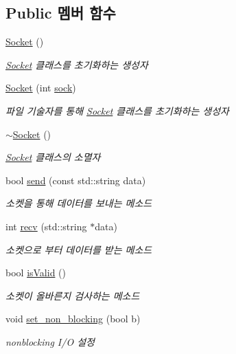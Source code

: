 \subsection*{Public 멤버 함수}
\begin{DoxyCompactItemize}
\item 
\hyperlink{classsock_1_1_socket_a9983ebd97b8f79d3e4c67fca05811dcb}{Socket} ()
\begin{DoxyCompactList}\small\item\em \hyperlink{classsock_1_1_socket}{Socket} 클래스를 초기화하는 생성자 \end{DoxyCompactList}\item 
\hyperlink{classsock_1_1_socket_a570a3285956f8923f490f9203a6d1d8f}{Socket} (int \hyperlink{classsock_1_1_socket_a01040adb35eea5ad276090b9db112f4a}{sock})
\begin{DoxyCompactList}\small\item\em 파일 기술자를 통해 \hyperlink{classsock_1_1_socket}{Socket} 클래스를 초기화하는 생성자 \end{DoxyCompactList}\item 
\mbox{\label{classsock_1_1_socket_a2efd63baf692cd9e466da55139f74838}} 
\hyperlink{classsock_1_1_socket_a2efd63baf692cd9e466da55139f74838}{$\sim$\+Socket} ()
\begin{DoxyCompactList}\small\item\em \hyperlink{classsock_1_1_socket}{Socket} 클래스의 소멸자 \end{DoxyCompactList}\item 
bool \hyperlink{classsock_1_1_socket_a1d980395d1e06e4b9e1c5c65a2220a0a}{send} (const std\+::string data)
\begin{DoxyCompactList}\small\item\em 소켓을 통해 데이터를 보내는 메소드 \end{DoxyCompactList}\item 
int \hyperlink{classsock_1_1_socket_aa52c41c177bd1f7fe785d32d46f60b9f}{recv} (std\+::string $\ast$data)
\begin{DoxyCompactList}\small\item\em 소켓으로 부터 데이터를 받는 메소드 \end{DoxyCompactList}\item 
bool \hyperlink{classsock_1_1_socket_a448363328243c35f7899761381cac1df}{is\+Valid} ()
\begin{DoxyCompactList}\small\item\em 소켓이 올바른지 검사하는 메소드 \end{DoxyCompactList}\item 
void \hyperlink{classsock_1_1_socket_a908007148692a4a8dfa6a339b679b8a8}{set\+\_\+non\+\_\+blocking} (bool b)
\begin{DoxyCompactList}\small\item\em nonblocking I/O 설정 \end{DoxyCompactList}\end{DoxyCompactItemize}

